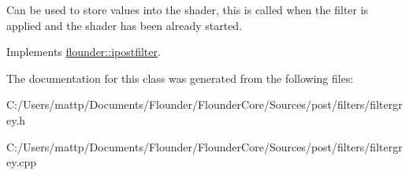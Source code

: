 Can be used to store values into the shader, this is called when the filter is applied and the shader has been already started. 



Implements \hyperlink{classflounder_1_1ipostfilter_a9b658b4672718d5ac36539875bde722e}{flounder\+::ipostfilter}.



The documentation for this class was generated from the following files\+:\begin{DoxyCompactItemize}
\item 
C\+:/\+Users/mattp/\+Documents/\+Flounder/\+Flounder\+Core/\+Sources/post/filters/filtergrey.\+h\item 
C\+:/\+Users/mattp/\+Documents/\+Flounder/\+Flounder\+Core/\+Sources/post/filters/filtergrey.\+cpp\end{DoxyCompactItemize}
